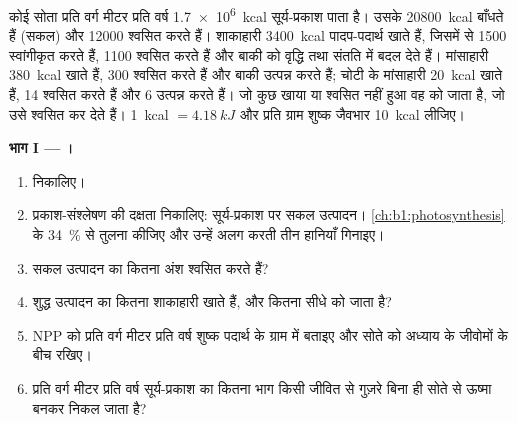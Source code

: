 \begin{problem}
\label{pb:b1:ecosystem-organization:1}
कोई सोता प्रति वर्ग मीटर प्रति वर्ष \qty{1.7e6}{kcal} सूर्य-प्रकाश पाता
है। उसके  \qty{20800}{kcal} बाँधते हैं (सकल) और \qty{12000}{}
श्वसित करते हैं। शाकाहारी \qty{3400}{kcal} पादप-पदार्थ खाते हैं, जिसमें
से \qty{1500}{} स्वांगीकृत करते हैं, \qty{1100}{} श्वसित करते हैं और बाकी
को वृद्धि तथा संतति में बदल देते हैं। मांसाहारी \qty{380}{kcal} खाते हैं,
\qty{300}{} श्वसित करते हैं और बाकी उत्पन्न करते हैं; चोटी के मांसाहारी
\qty{20}{kcal} खाते हैं, \qty{14}{} श्वसित करते हैं और \qty{6}{} उत्पन्न
करते हैं। जो कुछ खाया या श्वसित नहीं हुआ वह  को जाता है, जो उसे
श्वसित कर देते हैं। \qty{1}{kcal} $= \qty{4.18}{kJ}$ और प्रति ग्राम शुष्क
जैवभार \qty{10}{kcal} लीजिए।

\medskip
\noindent\textbf{भाग I --- ।}
\begin{enumerate}
  \item {} निकालिए।
  \item प्रकाश-संश्लेषण की दक्षता निकालिए: सूर्य-प्रकाश पर सकल
        उत्पादन। \cref{ch:b1:photosynthesis} के \qty{34}{\%} से तुलना
        कीजिए और उन्हें अलग करती तीन हानियाँ गिनाइए।
  \item {} सकल उत्पादन का कितना अंश श्वसित करते हैं?
  \item शुद्ध उत्पादन का कितना शाकाहारी खाते हैं, और कितना सीधे
         को जाता है?
  \item NPP को प्रति वर्ग मीटर प्रति वर्ष शुष्क पदार्थ के ग्राम में
        बताइए और सोते को अध्याय के जीवोमों के बीच रखिए।
  \item प्रति वर्ग मीटर प्रति वर्ष सूर्य-प्रकाश का कितना भाग किसी जीवित
         से गुज़रे बिना ही सोते से ऊष्मा बनकर निकल जाता है?
\end{enumerate}


\end{problem}
